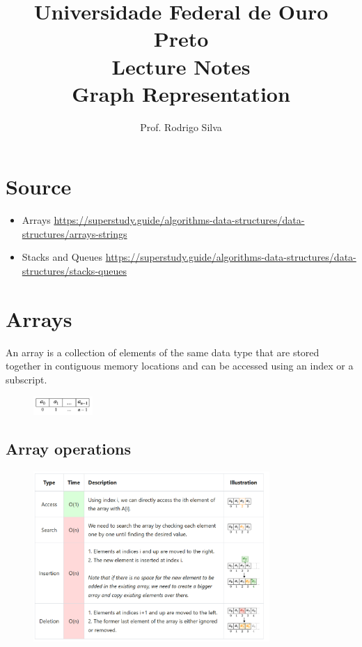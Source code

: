 \documentclass{article}
\title{\vspace{-2 cm}Universidade Federal de Ouro Preto \\ Lecture Notes \\ Graph Representation}
\author{Prof. Rodrigo Silva}
\begin{document}
\maketitle

\section*{Source}

\begin{itemize}
    \item Arrays \url{https://superstudy.guide/algorithms-data-structures/data-structures/arrays-strings}
    \item Stacks and Queues \url{https://superstudy.guide/algorithms-data-structures/data-structures/stacks-queues}
\end{itemize}

\section{Arrays}

An array is a collection of elements of the same data type that are stored together in contiguous memory locations and can be accessed using an index or a subscript.

\begin{figure}[!ht]
    \centering
    \includegraphics*[width=0.2\textwidth]{images/array.png}
\end{figure}

\subsection{Array operations}

\begin{figure}[!ht]
    \centering
    \includegraphics*[width=0.8\textwidth]{images/array_operations.png}
\end{figure}
\end{document}
